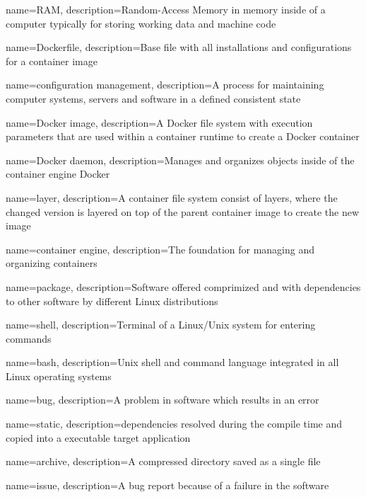 {
    name={RAM},
    description={Random-Access Memory in memory inside of a computer typically for storing working data and machine code}
}

{
    name={Dockerfile},
    description={Base file with all installations and configurations for a container image}
}

{
    name={configuration management},
    description={A process for maintaining computer systems, servers and software in a defined consistent state}
}

{
    name={Docker image},
    description={A Docker file system with execution parameters that are used within a container runtime to create a Docker container}
}

{
    name={Docker daemon},
    description={Manages and organizes objects inside of the container engine Docker}
}

{
    name={layer},
    description={A container file system consist of layers, where the changed version is layered on top of the parent container image to create the new image}
}

{
    name={container engine},
    description={The foundation for managing and organizing containers}
}

{
    name={package},
    description={Software offered comprimized and with dependencies to other software by different Linux distributions}
}

{
    name={shell},
    description={Terminal of a Linux/Unix system for entering commands}
}

{
    name={bash},
    description={Unix shell and command language integrated in all Linux operating systems}
}

{
    name={bug},
    description={A problem in software which results in an error}
}

{
    name={static},
    description={dependencies resolved during the compile time and copied into a executable target application}
}

{
    name={archive},
    description={A compressed directory saved as a single file}
}

{
    name={issue},
    description={A bug report because of a failure in the software}
}

